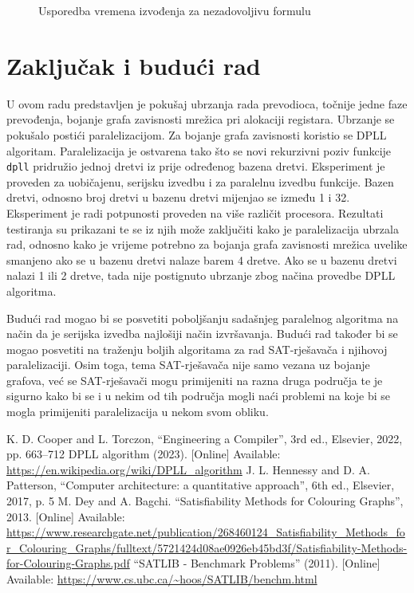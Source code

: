 \documentclass[hidelinks, conference]{IEEEtran}
\begin{document}
\begin{figure}[ht]
\centerline{}
\caption{Usporedba vremena izvođenja za nezadovoljivu formulu}
\label{fig5}
\end{figure}

\section{Zaključak i budući rad}

U ovom radu predstavljen je pokušaj ubrzanja rada prevodioca, točnije jedne faze prevođenja, bojanje grafa zavisnosti mrežica pri alokaciji registara. Ubrzanje se pokušalo postići paralelizacijom. Za bojanje grafa zavisnosti koristio se DPLL algoritam. Paralelizacija je ostvarena tako što se novi rekurzivni poziv funkcije \texttt{dpll} pridružio jednoj dretvi iz prije određenog bazena dretvi. Eksperiment je proveden za uobičajenu, serijsku izvedbu i za paralelnu izvedbu funkcije. Bazen dretvi, odnosno broj dretvi u bazenu dretvi mijenjao se između 1 i 32. Eksperiment je radi potpunosti proveden na više različit procesora. Rezultati testiranja su prikazani te se iz njih može zaključiti kako je paralelizacija ubrzala rad, odnosno kako je vrijeme potrebno za bojanja grafa zavisnosti mrežica uvelike smanjeno ako se u bazenu dretvi nalaze barem 4 dretve. Ako se u bazenu dretvi nalazi 1 ili 2 dretve, tada nije postignuto ubrzanje zbog načina provedbe DPLL algoritma.

Budući rad mogao bi se posvetiti poboljšanju sadašnjeg paralelnog algoritma na način da je serijska izvedba najlošiji način izvršavanja. Budući rad također bi se mogao posvetiti na traženju boljih algoritama za rad SAT-rješavača i njihovoj paralelizaciji. Osim toga, tema SAT-rješavača nije samo vezana uz bojanje grafova, već se SAT-rješavači mogu primijeniti na razna druga područja te je sigurno kako bi se i u nekim od tih područja mogli naći problemi na koje bi se mogla primijeniti paralelizacija u nekom svom obliku.

\begin{thebibliography}{00}
 K. D. Cooper and L. Torczon, ``Engineering a Compiler'', 3rd ed., Elsevier, 2022, pp. 663--712
 DPLL algorithm (2023). [Online] Available: \url{https://en.wikipedia.org/wiki/DPLL_algorithm}
 J. L. Hennessy and D. A. Patterson, ``Computer architecture: a quantitative approach'', 6th ed., Elsevier, 2017, p. 5
 M. Dey and A. Bagchi. ``Satisfiability Methods for Colouring Graphs'', 2013. [Online] Available:
\url{https://www.researchgate.net/publication/268460124_Satisfiability_Methods_for_Colouring_Graphs/fulltext/5721424d08ae0926eb45bd3f/Satisfiability-Methods-for-Colouring-Graphs.pdf}
 ``SATLIB - Benchmark Problems'' (2011). [Online] Available:
\url{https://www.cs.ubc.ca/~hoos/SATLIB/benchm.html}
\end{thebibliography}
\vspace{12pt}
\end{document}
